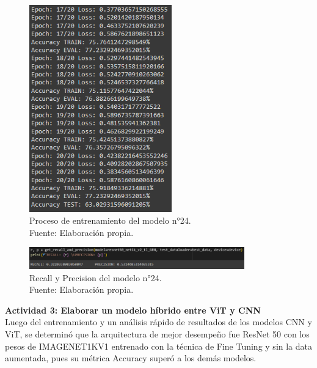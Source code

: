 \begin{figure}[H]
	\begin{center}
		\includegraphics[width=0.55\textwidth]{4/figures/model24_train.PNG}
		\caption[Proceso de entrenamiento del modelo n°24]{Proceso de entrenamiento del modelo n°24. \\
		Fuente: Elaboración propia.}
		\label{4:fig166}
	\end{center}
\end{figure}

\begin{figure}[H]
	\begin{center}
		\includegraphics[width=0.83\textwidth]{4/figures/model24_rp.PNG}
		\caption[Recall y Precision del modelo n°24]{Recall y Precision del modelo n°24. \\
		Fuente: Elaboración propia.}
		\label{4:fig167}
	\end{center}
\end{figure}

\textbf{Actividad 3:  Elaborar un modelo híbrido entre ViT y CNN}
\\
Luego del entrenamiento y un análisis rápido de resultados de los modelos CNN y ViT, se determinó que la arquitectura de mejor desempeño fue ResNet 50 con los pesos de IMAGENET1KV1 entrenado con la técnica de Fine Tuning y sin la data aumentada, pues su métrica Accuracy superó a los demás modelos.


